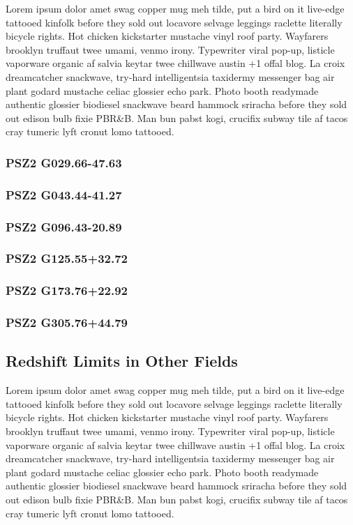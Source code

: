 \documentclass[apj, revtex4]{emulateapj}
\begin{document}
Lorem ipsum dolor amet swag copper mug meh tilde, put a bird on it live-edge tattooed kinfolk before they sold out locavore selvage leggings raclette literally bicycle rights. Hot chicken kickstarter mustache vinyl roof party. Wayfarers brooklyn truffaut twee umami, venmo irony. Typewriter viral pop-up, listicle vaporware organic af salvia keytar twee chillwave austin +1 offal blog. La croix dreamcatcher snackwave, try-hard intelligentsia taxidermy messenger bag air plant godard mustache celiac glossier echo park. Photo booth readymade authentic glossier biodiesel snackwave beard hammock sriracha before they sold out edison bulb fixie PBR\&B. Man bun pabst kogi, crucifix subway tile af tacos cray tumeric lyft cronut lomo tattooed.


\subsubsection{PSZ2 G029.66-47.63}

\subsubsection{PSZ2 G043.44-41.27}

\subsubsection{PSZ2 G096.43-20.89}

\subsubsection{PSZ2 G125.55+32.72}

\subsubsection{PSZ2 G173.76+22.92}

\subsubsection{PSZ2 G305.76+44.79}

\subsection{Redshift Limits in Other Fields}

Lorem ipsum dolor amet swag copper mug meh tilde, put a bird on it live-edge tattooed kinfolk before they sold out locavore selvage leggings raclette literally bicycle rights. Hot chicken kickstarter mustache vinyl roof party. Wayfarers brooklyn truffaut twee umami, venmo irony. Typewriter viral pop-up, listicle vaporware organic af salvia keytar twee chillwave austin +1 offal blog. La croix dreamcatcher snackwave, try-hard intelligentsia taxidermy messenger bag air plant godard mustache celiac glossier echo park. Photo booth readymade authentic glossier biodiesel snackwave beard hammock sriracha before they sold out edison bulb fixie PBR\&B. Man bun pabst kogi, crucifix subway tile af tacos cray tumeric lyft cronut lomo tattooed.
\end{document}
